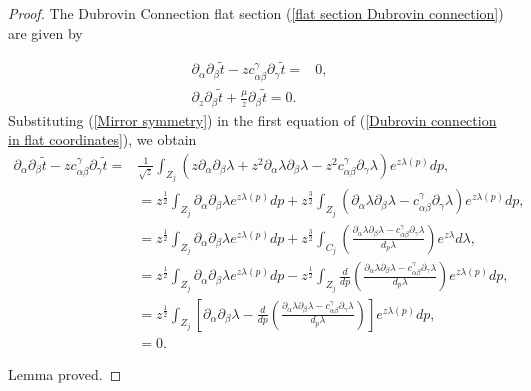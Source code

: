 \documentclass{article}
\theoremstyle{definition}
\begin{document}
\begin{proof}


The Dubrovin Connection flat section (\ref{flat section Dubrovin connection}) are given by

\begin{equation}\label{Dubrovin connection in flat coordinates}
\begin{split}
\partial_{\alpha}\partial_{\beta}\tilde t-zc_{\alpha\beta}^{\gamma}\partial_{\gamma}\tilde t=&0,\\
\partial_{z}\partial_{\beta}\tilde t+\frac{\mu}{z}\partial_{\beta}\tilde t=0.
\end{split}
\end{equation}
Substituting (\ref{Mirror symmetry}) in the first equation of  (\ref{Dubrovin connection in flat coordinates}), we obtain
\begin{equation}\label{Adam identity part 1}
\begin{split}
\partial_{\alpha}\partial_{\beta}\tilde t-zc_{\alpha\beta}^{\gamma}\partial_{\gamma}\tilde t=&\frac{1}{\sqrt{z}}\int_{Z_j} \left(z\partial_{\alpha}\partial_{\beta}\lambda +z^2\partial_{\alpha}\lambda\partial_{\beta}\lambda-z^2c_{\alpha\beta}^{\gamma}\partial_{\gamma}\lambda\right)e^{z\lambda(p)}dp,\\
&=z^{\frac{1}{2}}\int_{Z_j} \partial_{\alpha}\partial_{\beta}\lambda e^{z\lambda(p)}dp+z^{\frac{3}{2}}\int_{Z_j} \left(\partial_{\alpha}\lambda\partial_{\beta}\lambda-c_{\alpha\beta}^{\gamma}\partial_{\gamma}\lambda\right)e^{z\lambda(p)}dp,\\
&=z^{\frac{1}{2}}\int_{Z_j} \partial_{\alpha}\partial_{\beta}\lambda e^{z\lambda(p)}dp+z^{\frac{3}{2}}\int_{C_j} \left(\frac{\partial_{\alpha}\lambda\partial_{\beta}\lambda-c_{\alpha\beta}^{\gamma}\partial_{\gamma}\lambda}{d_p\lambda}\right)e^{z\lambda}d\lambda,\\
&=z^{\frac{1}{2}}\int_{Z_j} \partial_{\alpha}\partial_{\beta}\lambda e^{z\lambda(p)}dp-z^{\frac{1}{2}}\int_{Z_j} \frac{d}{dp}\left(\frac{\partial_{\alpha}\lambda\partial_{\beta}\lambda-c_{\alpha\beta}^{\gamma}\partial_{\gamma}\lambda}{d_p\lambda}\right)e^{z\lambda(p)}dp,\\
&=z^{\frac{1}{2}}\int_{Z_j}\left[ \partial_{\alpha}\partial_{\beta}\lambda - \frac{d}{dp}\left(\frac{\partial_{\alpha}\lambda\partial_{\beta}\lambda-c_{\alpha\beta}^{\gamma}\partial_{\gamma}\lambda}{d_p\lambda}\right)\right]e^{z\lambda(p)}dp,\\
&=0.
\end{split}
\end{equation}



Lemma proved.





\end{proof}
\end{document}
